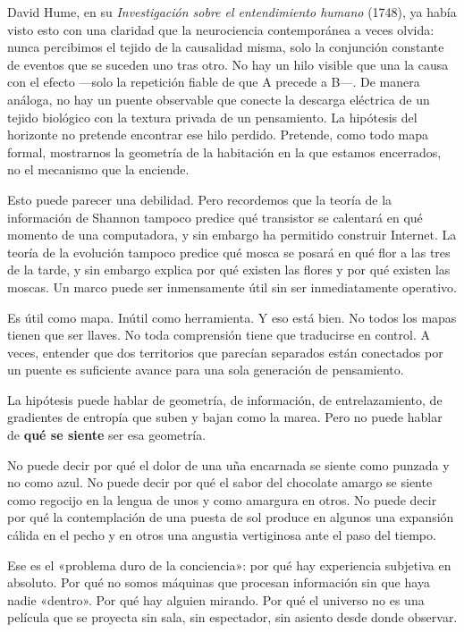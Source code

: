 David Hume, en su \emph{Investigación sobre el entendimiento humano} (1748), ya había visto esto con una claridad que la neurociencia contemporánea a veces olvida: nunca percibimos el tejido de la causalidad misma, solo la conjunción constante de eventos que se suceden uno tras otro. No hay un hilo visible que una la causa con el efecto —solo la repetición fiable de que A precede a B—. De manera análoga, no hay un puente observable que conecte la descarga eléctrica de un tejido biológico con la textura privada de un pensamiento. La hipótesis del horizonte no pretende encontrar ese hilo perdido. Pretende, como todo mapa formal, mostrarnos la geometría de la habitación en la que estamos encerrados, no el mecanismo que la enciende.

Esto puede parecer una debilidad. Pero recordemos que la teoría de la información de Shannon tampoco predice qué transistor se calentará en qué momento de una computadora, y sin embargo ha permitido construir Internet. La teoría de la evolución tampoco predice qué mosca se posará en qué flor a las tres de la tarde, y sin embargo explica por qué existen las flores y por qué existen las moscas. Un marco puede ser inmensamente útil sin ser inmediatamente operativo.

Es útil como mapa. Inútil como herramienta. Y eso está bien. No todos los mapas tienen que ser llaves. No toda comprensión tiene que traducirse en control. A veces, entender que dos territorios que parecían separados están conectados por un puente es suficiente avance para una sola generación de pensamiento.

\noindent La hipótesis puede hablar de geometría, de información, de entrelazamiento, de gradientes de entropía que suben y bajan como la marea. Pero no puede hablar de \textbf{qué se siente} ser esa geometría.

No puede decir por qué el dolor de una uña encarnada se siente como punzada y no como azul. No puede decir por qué el sabor del chocolate amargo se siente como regocijo en la lengua de unos y como amargura en otros. No puede decir por qué la contemplación de una puesta de sol produce en algunos una expansión cálida en el pecho y en otros una angustia vertiginosa ante el paso del tiempo.

Ese es el «problema duro de la conciencia»: por qué hay experiencia subjetiva en absoluto. Por qué no somos máquinas que procesan información sin que haya nadie «dentro». Por qué hay alguien mirando. Por qué el universo no es una película que se proyecta sin sala, sin espectador, sin asiento desde donde observar.

